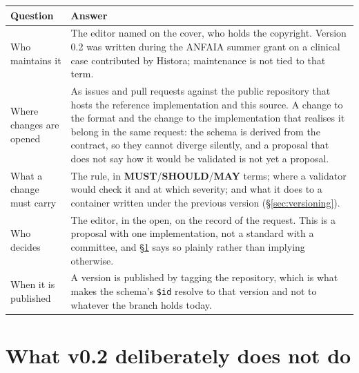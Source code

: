 \documentclass[11pt,a4paper]{article}
\newcommand{\MUST}{\textcolor{uosred}{\textbf{MUST}}}
\newcommand{\SHOULD}{\textcolor{uosamber}{\textbf{SHOULD}}}
\newcommand{\MAY}{\textcolor{uosgreen}{\textbf{MAY}}}
\newcommand{\code}[1]{\texttt{\small #1}}
\begin{document}
\begin{longtable}{L{3.4cm} L{12.0cm}}
\toprule
\textbf{Question} & \textbf{Answer}\\
\midrule
\endhead
Who maintains it & The editor named on the cover, who holds the copyright. Version 0.2 was
written during the ANFAIA summer grant on a clinical case contributed by Histora;
maintenance is not tied to that term.\\
Where changes are opened & As issues and pull requests against the public repository that
hosts the reference implementation and this source. A change to the format and the change
to the implementation that realises it belong in the same request: the schema is derived
from the contract, so they cannot diverge silently, and a proposal that does not say how it
would be validated is not yet a proposal.\\
What a change must carry & The rule, in \MUST/\SHOULD/\MAY{} terms; where a validator would
check it and at which severity; and what it does to a container written under the previous
version (\S\ref{sec:versioning}).\\
Who decides & The editor, in the open, on the record of the request. This is a proposal
with one implementation, not a standard with a committee, and \S\ref{sec:limits} says so
plainly rather than implying otherwise.\\
When it is published & A version is published by tagging the repository, which is what
makes the schema's \code{\$id} resolve to that version and not to whatever the branch holds
today.\\
\bottomrule
\end{longtable}

\section{What v0.2 deliberately does not do}\label{sec:limits}
\end{document}
